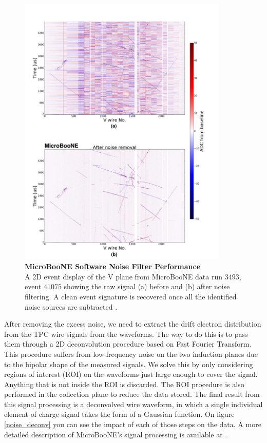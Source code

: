 \begin{figure}[h!]
    \centering
    \includegraphics[width=100mm]{Figures/noise_removal.jpeg}
    \caption[MicroBooNE Software Noise Filter Performance]{{\textbf{MicroBooNE Software Noise Filter Performance}}\\ A 2D event display of the V plane from MicroBooNE data run $3493$, event $41075$ showing the raw signal (a) before and (b) after noise filtering. A clean event signature is recovered once all the identified noise sources are subtracted \cite{noise_filter}.}
    \label{noise_filter}
\end{figure}

After removing the excess noise, we need to extract the drift electron distribution from the TPC wire signals from the waveforms. The way to do this is to pass them through a 2D deconvolution procedure based on Fast Fourier Transform. This procedure suffers from low-frequency noise on the two induction planes due to the bipolar shape of the measured signals. We solve this by only considering regions of interest (ROI) on the waveforms just large enough to cover the signal. Anything that is not inside the ROI is discarded. The ROI procedure is also performed in the collection plane to reduce the data stored. The final result from this signal processing is a deconvolved wire waveform, in which a single individual element of charge signal takes the form of a Gaussian function. On figure \ref{noise_deconv} you can see the impact of each of those steps on the data. A more detailed description of MicroBooNE's signal processing is available at \cite{signal_proc}. 

